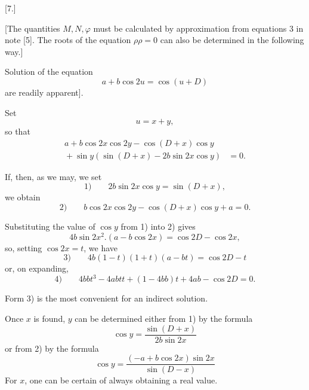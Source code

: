 \clearpage
\begingroup
{}
\renewcommand{\headrulewidth}{0pt}
\par\medskip
{}
\begin{center}[7.]\end{center}
\begingroup
\small
\par\noindent\hspace*{\parindent}[The quantities \(M,N,\varphi\) must be calculated by approximation from equations 3 in
note [5]. The roots of the
equation \(\rho\rho=0\) can also be determined in the following way.]
\par\noindent\hspace*{\parindent}Solution of the equation
\[
a+b\cos2u=\cos(u+D)
\]
\noindent[where \(u\) is written for \(E'\) and the relations of the constants \(a,b,D\)
to those in equation 1 of note [5] are readily apparent].
\par\noindent\hspace*{\parindent}Set
\[
u=x+y,
\]
\noindent so that
\[
\begin{aligned}
a+b\cos2x\cos2y-\cos(D+x)\cos y&\\
{}+\sin y(\sin(D+x)-2b\sin2x\cos y)&=0.
\end{aligned}
\]
\par\noindent\hspace*{\parindent}If, then, as we may, we set
\[
\text{1)}\qquad 2b\sin2x\cos y=\sin(D+x),
\]
\noindent we obtain
\[
\text{2)}\qquad b\cos2x\cos2y-\cos(D+x)\cos y+a=0.
\]
\par\noindent\hspace*{\parindent}Substituting the value of \(\cos y\) from 1) into 2) gives
\[
4b\sin2x^2\mathord{.}(a-b\cos2x)=\cos2D-\cos2x,
\]
\noindent so, setting \(\cos2x=t\), we have
\[
\text{3)}\qquad 4b(1-t)(1+t)(a-bt)=\cos2D-t
\]
\noindent or, on expanding,
\[
\text{4)}\qquad 4bbt^3-4abtt+(1-4bb)t+4ab-\cos2D=0.
\]
\par\noindent\hspace*{\parindent}Form 3) is the most convenient for an indirect solution.
\par\noindent\hspace*{\parindent}Once \(x\) is found, \(y\) can be determined either from 1) by
the formula
\[
\cos y=\frac{\sin(D+x)}{2b\sin2x}
\]
\noindent or from 2) by the formula
\[
\cos y=\frac{(-a+b\cos2x)\sin2x}{\sin(D-x)}
\]
\noindent For \(x\), one can be certain of always obtaining a real value.

